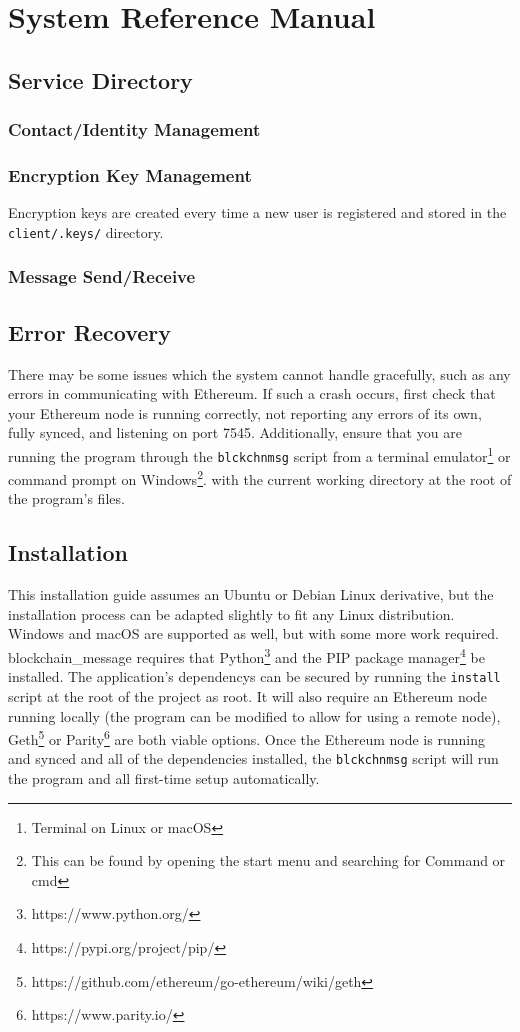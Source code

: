 \documentclass[titlepage]{report}
\begin{document}
\section{System Reference Manual}
\subsection{Service Directory}

\subsubsection{Contact/Identity Management}
\subsubsection{Encryption Key Management}
Encryption keys are created every time a new user is registered and stored in the \texttt{client/.keys/} directory.
\subsubsection{Message Send/Receive}

\subsection{Error Recovery}
There may be some issues which the system cannot handle gracefully, such as any errors in communicating with Ethereum. If such a crash occurs, first check that your \gls{Ethereum} \gls{node} is running correctly, not reporting any errors of its own, fully synced, and listening on port 7545. Additionally, ensure that you are running the program through the \texttt{blckchnmsg} script from a terminal emulator\footnote{Terminal on Linux or macOS} or command prompt on Windows\footnote{This can be found by opening the start menu and searching for Command or cmd}. with the current working directory at the root of the program's files.

\subsection{Installation}
This installation guide assumes an Ubuntu or Debian Linux derivative, but the installation process can be adapted slightly to fit any Linux distribution. Windows and macOS are supported as well, but with some more work required. blockchain\_message requires that Python\footnote{https://www.python.org/} and the PIP package manager\footnote{https://pypi.org/project/pip/} be installed. The application's \glspl{dependency} can be secured by running the \texttt{install} script at the root of the project as root. It will also require an Ethereum \gls{node} running locally (the program can be modified to allow for using a remote \gls{node}), Geth\footnote{https://github.com/ethereum/go-ethereum/wiki/geth} or Parity\footnote{https://www.parity.io/} are both viable options. Once the Ethereum \gls{node} is running and \gls{synced} and all of the dependencies installed, the \texttt{blckchnmsg} script will run the program and all first-time setup automatically.

\pagebreak

\printindex
\printglossaries{}
\printbibliography{}
\end{document}
